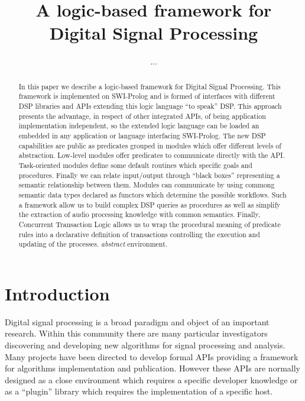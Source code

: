 \documentclass{article}
\begin{document}
\title{A logic-based framework for Digital Signal Processing}

\author{...}

\maketitle


\begin{abstract}
In this paper we describe a logic-based framework for Digital Signal Processing. This framework is implemented on SWI-Prolog and is formed of interfaces with different DSP libraries and APIs extending this logic language ``to speak'' DSP. This approach presents the advantage, in respect of other integrated APIs, of being application implementation independent, so the extended logic language can be loaded an embedded in any application or language interfacing SWI-Prolog. The new DSP capabilities are public as predicates grouped in modules which offer different levels of abstraction. Low-level modules offer predicates to communicate directly with the API. Task-oriented modules define some default routines which specific goals and procedures. Finally we can relate input/output through ``black boxes'' representing a semantic relationship between them. Modules can communicate by using commong semantic data types declared as functors which determine the possible workflows. Such a framework allow us to build complex DSP queries as procedures as well as simplify the extraction of audio processing knowledge with common semantics. Finally, Concurrent Transaction Logic allows us to wrap the procedural meaning of predicate rules into a declarative definition of transactions controlling the execution and updating of the processes.
\emph{abstract} environment.

\end{abstract}


\section{Introduction}

Digital signal processing is a broad paradigm and object of an important research. Within this community there are many particular investigators discovering and developing new algorithms for signal processing and analysis. Many projects have been directed to develop formal APIs providing a framework for algorithms implementation and publication. However these APIs are normally designed as a close environment which requires a specific developer knowledge or as a ``plugin'' library which requires the implementation of a specific host.
\end{document}
